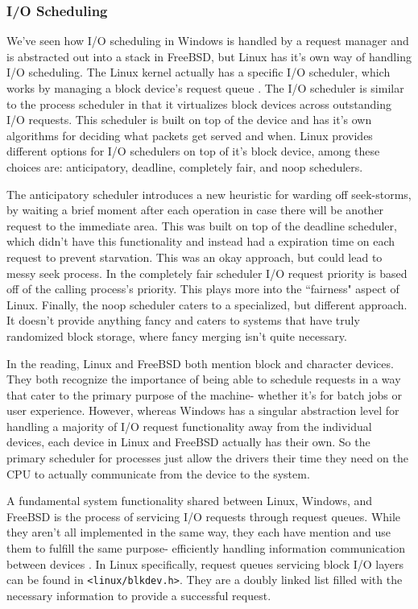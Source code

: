 \documentclass[10pt,draftclsnofoot,onecolumn]{IEEEtran}
\begin{document}
\subsubsection{I/O Scheduling}
\label{sub:IOScheduling Linux}
\par We've seen how I/O scheduling in Windows is handled by a request manager and is abstracted out into a stack in FreeBSD, but Linux has it's own way of handling I/O scheduling.
The Linux kernel actually has a specific I/O scheduler, which works by managing a block device's request queue \cite{linux:1}.
The I/O scheduler is similar to the process scheduler in that it virtualizes block devices across outstanding I/O requests.
This scheduler is built on top of the device and has it's own algorithms for deciding what packets get served and when.
Linux provides different options for I/O schedulers on top of it's block device, among these choices are: anticipatory, deadline, completely fair, and noop schedulers.

\par The anticipatory scheduler introduces a new heuristic for warding off seek-storms, by waiting a brief moment after each operation in case there will be another request to the immediate area.
This was built on top of the deadline scheduler, which didn't have this functionality and instead had a expiration time on each request to prevent starvation.
This was an okay approach, but could lead to messy seek process.
In the completely fair scheduler I/O request priority is based off of the calling process's priority.
This plays more into the ``fairness" aspect of Linux.
Finally, the noop scheduler caters to a specialized, but different approach.
It doesn't provide anything fancy and caters to systems that have truly randomized block storage, where fancy merging isn't quite necessary.

\par In the reading, Linux and FreeBSD both mention block and character devices.
They both recognize the importance of being able to schedule requests in a way that cater to the primary purpose of the machine- whether it's for batch jobs or user experience.
However, whereas Windows has a singular abstraction level for handling a majority of I/O request functionality away from the individual devices, each device in Linux and FreeBSD actually has their own.
So the primary scheduler for processes just allow the drivers their time they need on the CPU to actually communicate from the device to the system.

\par A fundamental system functionality shared between Linux, Windows, and FreeBSD is the process of servicing I/O requests through request queues.
While they aren't all implemented in the same way, they each have mention and use them to fulfill the same purpose- efficiently handling information communication between devices \cite{bsd:1} \cite{win:2} \cite{linux:1}.
In Linux specifically, request queues servicing block I/O layers can be found in \texttt{<linux/blkdev.h>}.
They are a doubly linked list filled with the necessary information to provide a successful request.\\
\end{document}
